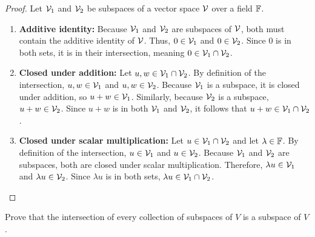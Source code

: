 \begin{proof}
	Let $\mathcal{V}_1$ and $\mathcal{V}_2$ be subspaces of a vector space $\mathcal{V}$ over a field $\mathbb{F}$.
	\begin{enumerate}
		\item \textbf{Additive identity:} Because $\mathcal{V}_1$ and $\mathcal{V}_2$ are subspaces of $\mathcal{V}$, both must contain the additive identity of $\mathcal{V}$. Thus, $0 \in \mathcal{V}_1$ and $0 \in \mathcal{V}_2$. Since $0$ is in both sets, it is in their intersection, meaning $0 \in \mathcal{V}_1 \cap \mathcal{V}_2$.
		
		\item \textbf{Closed under addition:} Let $u, w \in \mathcal{V}_1 \cap \mathcal{V}_2$. By definition of the intersection, $u, w \in \mathcal{V}_1$ and $u, w \in \mathcal{V}_2$. Because $\mathcal{V}_1$ is a subspace, it is closed under addition, so $u + w \in \mathcal{V}_1$. Similarly, because $\mathcal{V}_2$ is a subspace, $u + w \in \mathcal{V}_2$. Since $u + w$ is in both $\mathcal{V}_1$ and $\mathcal{V}_2$, it follows that $u + w \in \mathcal{V}_1 \cap \mathcal{V}_2$.
		
		\item \textbf{Closed under scalar multiplication:} Let $u \in \mathcal{V}_1 \cap \mathcal{V}_2$ and let $\lambda \in \mathbb{F}$. By definition of the intersection, $u \in \mathcal{V}_1$ and $u \in \mathcal{V}_2$. Because $\mathcal{V}_1$ and $\mathcal{V}_2$ are subspaces, both are closed under scalar multiplication. Therefore, $\lambda u \in \mathcal{V}_1$ and $\lambda u \in \mathcal{V}_2$. Since $\lambda u$ is in both sets, $\lambda u \in \mathcal{V}_1 \cap \mathcal{V}_2$.
	\end{enumerate}
\end{proof}
\begin{question}
	Prove that the intersection of every collection of subspaces of $V$ is a subspace of $V$.
\end{question}
